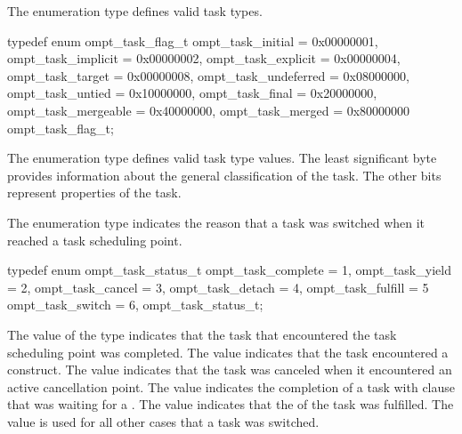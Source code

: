 \label{sec:ompt_task_flag_t}

\summary
The  enumeration type defines valid task types.

\format
\begin{ccppspecific}
\begin{omptEnum}
typedef enum ompt_task_flag_t {
  ompt_task_initial                   = 0x00000001,
  ompt_task_implicit                  = 0x00000002,
  ompt_task_explicit                  = 0x00000004,
  ompt_task_target                    = 0x00000008,
  ompt_task_undeferred                = 0x08000000,
  ompt_task_untied                    = 0x10000000,
  ompt_task_final                     = 0x20000000,
  ompt_task_mergeable                 = 0x40000000,
  ompt_task_merged                    = 0x80000000
} ompt_task_flag_t;
\end{omptEnum}
\end{ccppspecific}

\descr
The  enumeration type defines valid task type values.
The least significant byte provides information about the general classification 
of the task. The other bits represent properties of the task.




\label{sec:ompt_task_status_t}

\summary
The  enumeration type indicates the reason 
that a task was switched when it reached a task scheduling point.

\format
\begin{ccppspecific}
\begin{omptEnum}
typedef enum ompt_task_status_t {
  ompt_task_complete  = 1,
  ompt_task_yield     = 2,
  ompt_task_cancel    = 3,
  ompt_task_detach    = 4,
  ompt_task_fulfill   = 5
  ompt_task_switch    = 6,
} ompt_task_status_t;
\end{omptEnum}
\end{ccppspecific}

\descr
The value  of the  type  indicates 
that the task that encountered the task scheduling point was completed. The value 
 indicates that the task encountered a  
construct. The value  indicates that the task was canceled 
when it encountered an active cancellation point. The value  
indicates the completion of a task with  clause that was waiting for a 
. The value  indicates that the 
 of the task was fulfilled. The value 
 is used for all other cases that a task was switched.



